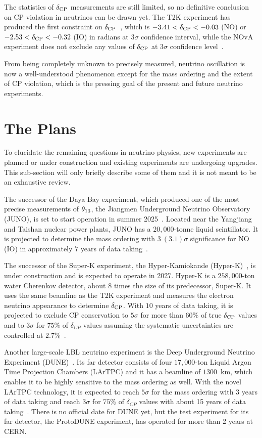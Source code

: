 The statistics of $\delta_\textrm{CP}$ measurements are still limited, so no definitive conclusion on CP violation in neutrinos can be drawn yet. 
The T2K experiment has produced the first constraint on $\delta_\textrm{CP}$~\cite{T2K:2019bcf}, which is $-3.41<\delta_\textrm{CP}<-0.03$ (NO) or $-2.53<\delta_\textrm{CP}<-0.32$ (IO) in radians at $3\sigma$ confidence interval, while the NOvA experiment does not exclude any values of $\delta_\textrm{CP}$ at $3\sigma$ confidence level~\cite{NOvA:2019cyt}.

From being completely unknown to precisely measured, neutrino oscillation is now a well-understood phenomenon except for the mass ordering and the extent of CP violation, which is the pressing goal of the present and future neutrino experiments.
 
\section{The Plans}
To elucidate the remaining questions in neutrino physics, new experiments are planned or under construction and existing experiments are undergoing upgrades.
This sub-section will only briefly describe some of them and it is not meant to be an exhaustive review.

The successor of the Daya Bay experiment, which produced one of the most precise measurements of $\theta_{13}$, the Jiangmen Underground Neutrino Observatory (JUNO), is set to start operation in summer 2025~\cite{ScienceNews2025}.
Located near the Yangjiang and Taishan nuclear power plants, JUNO has a $20,000$-tonne liquid scintillator.
It is projected to determine the mass ordering with $3~(3.1)\sigma$ significance for NO (IO) in approximately $7$ years of data taking~\cite{Paoloni:2024atc}.

The successor of the Super-K experiment, the Hyper-Kamiokande (Hyper-K)~\cite{Hyper-Kamiokande:2018ofw}, is under construction and is expected to operate in 2027.
Hyper-K is a $258,000$-ton water Cherenkov detector, about $8$ times the size of its predecessor, Super-K.
It uses the same beamline as the T2K experiment and measures the electron neutrino appearance to determine $\delta_\textrm{CP}$.
With $10$ years of data taking, it is projected to exclude CP conservation to $5\sigma$ for more than $60\%$ of true $\delta_\textrm{CP}$ values and to $3\sigma$ for $75\%$ of $\delta_{CP}$ values assuming the systematic uncertainties are controlled at $2.7\%$~\cite{Jesus-Valls:2024ady}.

Another large-scale LBL neutrino experiment is the Deep Underground Neutrino Experiment (DUNE)~\cite{DUNE:2016hlj,DUNE:2015lol,DUNE:2016evb,DUNE:2016rla,DUNE:2021tad}.
Its far detector consists of four $17,000$-ton Liquid Argon Time Projection Chambers (LArTPC) and it has a beamline of $1300$~km, which enables it to be highly sensitive to the mass ordering as well.
With the novel LArTPC technology, it is expected to reach $5\sigma$ for the mass ordering with 3 years of data taking and reach $3\sigma$ for $75\%$ of $\delta_{CP}$ values with about 15 years of data taking~\cite{Gil-Botella:2024duf}.
There is no official date for DUNE yet, but the test experiment for its far detector, the ProtoDUNE experiment, has operated for more than 2 years at CERN.

